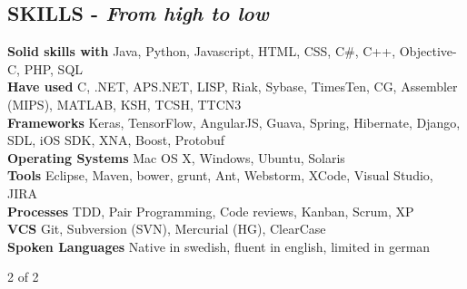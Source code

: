 \documentclass[overlapped]{res}
\begin{document}
\begin{resume}
\section {{\sc SKILLS} - {\sl From high to low}}
{\bf Solid skills with} Java, Python, Javascript, HTML, CSS, C\#, C++, Objective-C, PHP, SQL\\
{\bf Have used} C, .NET, APS.NET, LISP, Riak, Sybase, TimesTen, CG, Assembler (MIPS), MATLAB, KSH, TCSH, TTCN3 \\
{\bf Frameworks} Keras, TensorFlow, AngularJS, Guava, Spring, Hibernate, Django, SDL, iOS SDK, XNA, Boost, Protobuf \\
{\bf Operating Systems} Mac OS X, Windows, Ubuntu, Solaris\\
{\bf Tools} Eclipse, Maven, bower, grunt, Ant, Webstorm, XCode, Visual Studio, JIRA\\
{\bf Processes} TDD, Pair Programming, Code reviews, Kanban, Scrum, XP\\
{\bf VCS} Git, Subversion (SVN), Mercurial (HG), ClearCase\\
{\bf Spoken Languages} Native in swedish, fluent in english, limited in german \\
\vspace{5.6cm}
\centerline{2 of 2}

\end{resume} 
\end{document}
